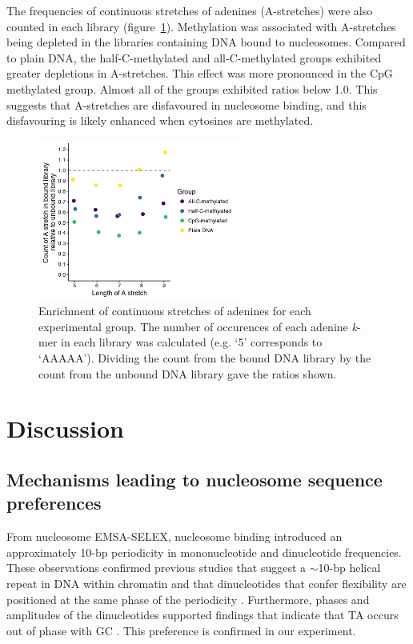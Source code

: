 \documentclass[parskip=full, numbers=noenddot]{scrbook}
\begin{document}
The frequencies of continuous stretches of adenines (A-stretches) were also counted in each library (figure~\ref{fig:astretch}).  Methylation was associated with A-stretches being depleted in the libraries containing DNA bound to nucleosomes.  Compared to plain DNA, the half-C-methylated and all-C-methylated groups exhibited greater depletions in A-stretches.  This effect was more pronounced in the CpG methylated group.  Almost all of the groups exhibited ratios below 1.0.  This suggests that A-stretches are disfavoured in nucleosome binding, and this disfavouring is likely enhanced when cytosines are methylated.

\begin{figure}[htbp]
  \centering
  \includegraphics[width=0.6\textwidth]{astretch}
  \caption{Enrichment of continuous stretches of adenines for each experimental group.  The number of occurences of each adenine \emph{k}-mer in each library was calculated (e.g. `5' corresponds to `AAAAA').  Dividing the count from the bound DNA library by the count from the unbound DNA library gave the ratios shown.}
  \label{fig:astretch}
\end{figure}

\section{Discussion}
\label{sec:emsaselex_discussion}

\subsection{Mechanisms leading to nucleosome sequence preferences}
\label{ssec:emsaselex_discussion_seqpref}

From nucleosome EMSA-SELEX, nucleosome binding introduced an approximately 10-bp periodicity in mononucleotide and dinucleotide frequencies.  These observations confirmed previous studies that suggest a $\sim$10-bp helical repeat in DNA within chromatin and that dinucleotides that confer flexibility are positioned at the same phase of the periodicity \citep{struhl_determinants_2013}.  Furthermore, phases and amplitudes of the dinucleotides supported findings that indicate that TA occurs out of phase with GC \citep{struhl_determinants_2013}.  This preference is confirmed in our experiment.
\end{document}
